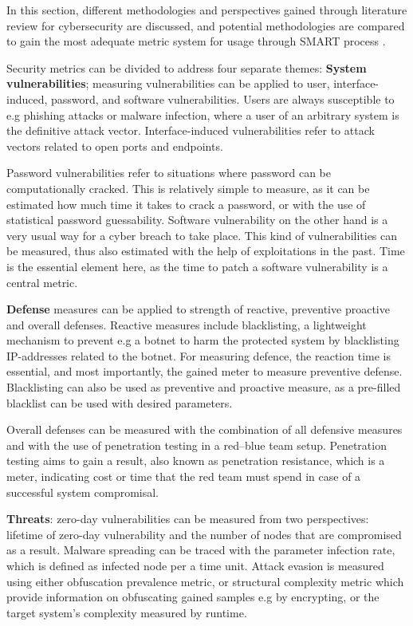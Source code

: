 In this section, different methodologies and perspectives gained
through literature review for cybersecurity are discussed, and
potential methodologies are compared to gain the most adequate metric
system for usage through SMART process \cite{payne2006guide}.

Security metrics can be divided to address four separate themes:
\textbf{System vulnerabilities}; measuring vulnerabilities can be
applied to user, interface-induced, password, and software
vulnerabilities. Users are always susceptible to e.g phishing attacks
or malware infection, where a user of an arbitrary system is the
definitive attack vector. Interface-induced vulnerabilities refer to
attack vectors related to open ports and
endpoints. \cite{pendleton2016survey}

Password vulnerabilities refer to situations where password can be
computationally cracked. This is relatively simple to measure, as it
can be estimated how much time it takes to crack a password, or with
the use of statistical password guessability. Software vulnerability
on the other hand is a very usual way for a cyber breach to take
place. This kind of vulnerabilities can be measured, thus also
estimated with the help of exploitations in the past. Time is the
essential element here, as the time to patch a software vulnerability
is a central metric. \cite{pendleton2016survey}

\textbf{Defense} measures can be applied to strength of reactive,
preventive proactive and overall defenses. Reactive measures include
blacklisting, a lightweight mechanism to prevent e.g a botnet to harm
the protected system by blacklisting IP-addresses related to the
botnet. For measuring defence, the reaction time is essential, and
most importantly, the gained meter to measure preventive
defense. Blacklisting can also be used as preventive and proactive
measure, as a pre-filled blacklist can be used with desired
parameters. \cite{pendleton2016survey} \cite{ramos2017model}

Overall defenses can be measured with the combination of all defensive
measures and with the use of penetration testing in a red–blue team
setup. Penetration testing aims to gain a result, also known as
penetration resistance, which is a meter, indicating cost or time that
the red team must spend in case of a successful system
compromisal. \cite{pendleton2016survey} \cite{ramos2017model}

\textbf{Threats}: zero-day vulnerabilities can be measured from two
perspectives: lifetime of zero-day vulnerability and the number of
nodes that are compromised as a result. Malware spreading can be
traced with the parameter infection rate, which is defined as infected
node per a time unit. Attack evasion is measured using either
obfuscation prevalence metric, or structural complexity metric which
provide information on obfuscating gained samples e.g by encrypting,
or the target system's complexity measured by
runtime. \cite{pendleton2016survey} \cite{ramos2017model}

